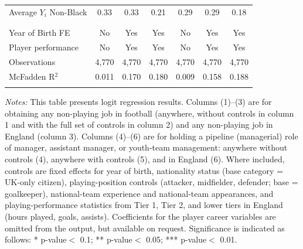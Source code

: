 \begin{table}[!h]
{\begin{threeparttable}
\begin{tabular}{@{\extracolsep{15pt}}lcccccc}
Average $Y_{i}$ Non-Black & 0.33 & 0.33 & 0.21 & 0.29 & 0.29 & 0.18 \\ 
  & & & & & & \\ 
\hline \\[-1.8ex]
Year of Birth FE & No & Yes & Yes & No & Yes & Yes \\
Player performance & No & Yes & Yes & No & Yes & Yes \\
Observations & 4,770 & 4,770 & 4,770 & 4,770 & 4,770 & 4,770 \\
McFadden R$^{2}$ & 0.011 & 0.170 & 0.180 & 0.009 & 0.158 & 0.188 \\
\hline
\hline \\[-1.8ex]
\end{tabular}
\begin{tablenotes}[flushleft]
		\item[] \scriptsize \textit{Notes:} This table presents logit regression results. Columns (1)--(3) are for obtaining any non-playing job in football (anywhere, without controls in column 1 and with the full set of controls in column 2) and any non-playing job in England (column 3). Columns (4)--(6) are for holding a pipeline (managerial) role of manager, assistant manager, or youth-team management: anywhere without controls (4), anywhere with controls (5), and in England (6). Where included, controls are fixed effects for year of birth, nationality status (base category = UK-only citizen), playing-position controls (attacker, midfielder, defender; base = goalkeeper), national-team experience and national-team appearances, and playing-performance statistics from Tier 1, Tier 2, and lower tiers in England (hours played, goals, assists). Coefficients for the player career variables are omitted from the output, but available on request. Significance is indicated as follows: * p-value$<$ 0.1; ** p-value$<$ 0.05; *** p-value$<$ 0.01.
		\end{tablenotes}
  \end{threeparttable}
  }
\end{table}
